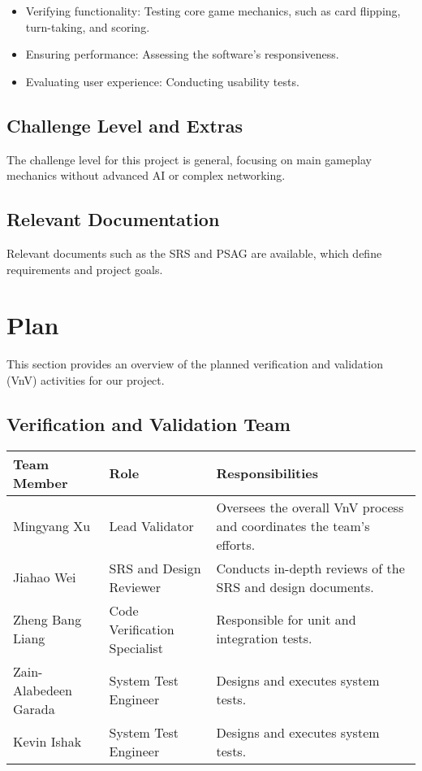 \documentclass{article}
\begin{document}
\begin{itemize}
    \item Verifying functionality: Testing core game mechanics, such as card flipping, turn-taking, and scoring.
    \item Ensuring performance: Assessing the software’s responsiveness.
    \item Evaluating user experience: Conducting usability tests.
\end{itemize}

\subsection{Challenge Level and Extras}
The challenge level for this project is general, focusing on main gameplay mechanics without advanced AI or complex networking.

\subsection{Relevant Documentation}
Relevant documents such as the SRS and PSAG are available, which define requirements and project goals.

\section{Plan}
This section provides an overview of the planned verification and validation (VnV) activities for our project.

\subsection{Verification and Validation Team}
\begin{longtable}{|l|l|p{9cm}|}
\hline
\textbf{Team Member} & \textbf{Role} & \textbf{Responsibilities} \\
\hline
Mingyang Xu & Lead Validator & Oversees the overall VnV process and coordinates the team's efforts. \\
Jiahao Wei & SRS and Design Reviewer & Conducts in-depth reviews of the SRS and design documents. \\
Zheng Bang Liang & Code Verification Specialist & Responsible for unit and integration tests. \\
Zain-Alabedeen Garada & System Test Engineer & Designs and executes system tests. \\
Kevin Ishak & System Test Engineer & Designs and executes system tests. \\
\hline
\end{longtable}
\end{document}
